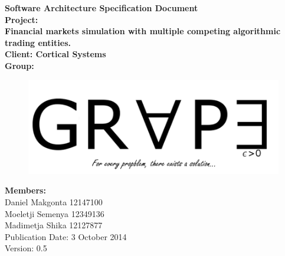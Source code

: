 \documentclass[12pt]{article}
\newcommand{\Title}{Software Architecture Specification Document} %
\begin{document}
	\begin{center}%
		\LARGE \bf \Title \\[2em]
		\Large {Project:}\\
		Financial markets simulation with multiple competing algorithmic trading entities.\\[0.7em]
		\Large {Client:}
		Cortical Systems\\[2em]
		\LARGE {\bf Group:}\\
			\begin{figure}[ht!]
				\centering
				\includegraphics[scale=0.4]{Logo8.png}
			\end{figure}
			
		\Large {\bf Members:}\\[0.3em]
		\large
		Daniel Makgonta 12147100\\
		Moeletji Semenya 12349136\\
		Madimetja Shika 12127877\\[3em]
	
	\small Publication Date: 3 October 2014\\[0.5em]
	\small Version: 0.5		    
	\end{center}%
	
\end{document}
